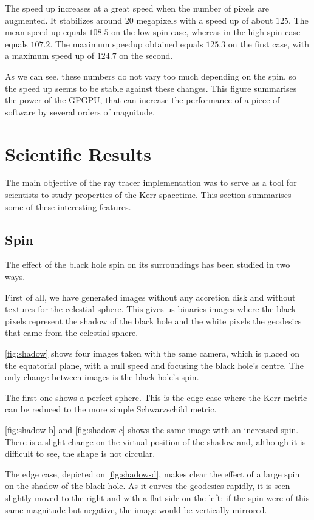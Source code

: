 The speed up increases at a great speed when the number of pixels are augmented. It stabilizes around 20 megapixels with a speed up of about $125$. The mean speed up equals $108.5$ on the low spin case, whereas in the high spin case equals $107.2$. The maximum speedup obtained equals $125.3$ on the first case, with a maximum speed up of $124.7$ on the second.

As we can see, these numbers do not vary too much depending on the spin, so the speed up seems to be stable against these changes. This figure summarises the power of the \ac{GPGPU}, that can increase the performance of a piece of software by several orders of magnitude.


\section{Scientific Results}

The main objective of the ray tracer implementation was to serve as a tool for scientists to study properties of the Kerr spacetime. This section summarises some of these interesting features.

\subsection{Spin}

The effect of the black hole spin on its surroundings has been studied in two ways.

First of all, we have generated images without any accretion disk and without textures for the celestial sphere. This gives us binaries images where the black pixels represent the shadow of the black hole and the white pixels the geodesics that came from the celestial sphere.

\autoref{fig:shadow} shows four images taken with the same camera, which is placed on the equatorial plane, with a null speed and focusing the black hole's centre. The only change between images is the black hole's spin.

The first one shows a perfect sphere. This is the edge case where the Kerr metric can be reduced to the more simple Schwarzschild metric.

\autoref{fig:shadow-b} and \autoref{fig:shadow-c} shows the same image with an increased spin. There is a slight change on the virtual position of the shadow and, although it is difficult to see, the shape is not circular.

The edge case, depicted on \autoref{fig:shadow-d}, makes clear the effect of a large spin on the shadow of the black hole. As it curves the geodesics rapidly, it is seen slightly moved to the right and with a flat side on the left: if the spin were of this same magnitude but negative, the image would be vertically mirrored.

